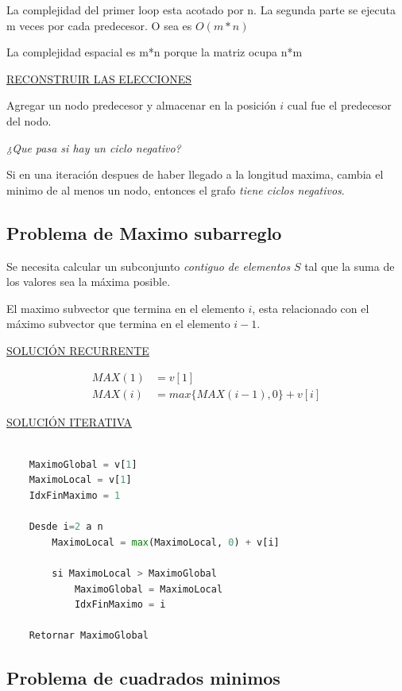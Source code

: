 \documentclass{article}
\begin{document}
La complejidad del primer loop esta acotado por n. La segunda parte se ejecuta m veces por cada predecesor.
O sea es \(O(m*n)\)

La complejidad espacial es m*n porque la matriz ocupa n*m

\underline{RECONSTRUIR LAS ELECCIONES}

Agregar un nodo predecesor y almacenar en la posición \(i\) cual fue el predecesor del nodo.

\textit{¿Que pasa si hay un ciclo negativo?}

Si en una iteración despues de haber llegado a la longitud maxima, cambia el minimo de al menos un nodo, entonces el grafo \textit{tiene ciclos negativos}.

\newpage
\subsection{Problema de Maximo subarreglo}

Se necesita calcular un subconjunto \textit{contiguo de elementos} \(S\) 
tal que la suma de los valores sea la máxima posible. 

El maximo subvector que termina en el elemento \(i\), esta relacionado con el máximo
subvector que termina en el elemento \(i-1\).

\underline{SOLUCIÓN RECURRENTE}

\begin{align*}
    MAX(1) &= v[1] \\
    MAX(i) &= max\{MAX(i-1), 0\} + v[i]
\end{align*}
    

\underline{SOLUCIÓN ITERATIVA}

\begin{lstlisting}[language=Python, caption=Solución iterativa]

    MaximoGlobal = v[1]
    MaximoLocal = v[1]
    IdxFinMaximo = 1

    Desde i=2 a n
        MaximoLocal = max(MaximoLocal, 0) + v[i]

        si MaximoLocal > MaximoGlobal
            MaximoGlobal = MaximoLocal 
            IdxFinMaximo = i

    Retornar MaximoGlobal

\end{lstlisting}

\newpage
\subsection{Problema de cuadrados minimos}
\end{document}
